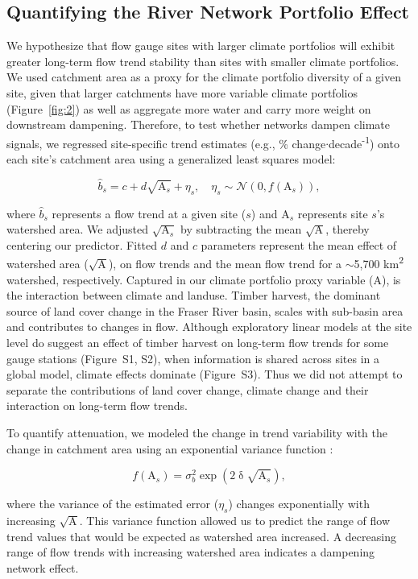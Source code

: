 \documentclass[draft,linenumbers]{AGUJournal}
\begin{document}
\subsection{Quantifying the River Network Portfolio Effect}

We hypothesize that flow gauge sites with larger climate portfolios will exhibit greater long-term flow trend stability than sites with smaller climate portfolios. We used catchment area as a proxy for the climate portfolio diversity of a given site, given that larger catchments have more variable climate portfolios (Figure~\ref{fig:2}) as well as aggregate more water and carry more weight on downstream dampening. Therefore, to test whether networks dampen climate signals, we regressed site-specific trend estimates (e.g., \% change$\cdot$decade\textsuperscript{-1}) onto each site's catchment area using a generalized least squares model:
\begin{linenomath*}
\begin{equation}
	\hat{b}_{s} = c + d\sqrt{\mathrm{A}_{s}} + \eta_{s}, \quad
  \eta_{s} \sim \mathcal{N}(0, f(\mathrm{A}_{s})) \label{eq3},
\end{equation}
\end{linenomath*}
where $\hat{b}_{s}$ represents a flow trend at a given site ($s$) and $\mathrm{A}_{s}$ represents site $s$'s watershed area. We adjusted $\sqrt{\mathrm{A}_{s}}$ by subtracting the mean $\sqrt{\mathrm{A}}$, thereby centering our predictor. Fitted $d$ and $c$ parameters represent the mean effect of watershed area ($\sqrt{\mathrm{A}}$), on flow trends and the mean flow trend for a $\sim$5,700 km\textsuperscript{2} watershed, respectively. Captured in our climate portfolio proxy variable ($\mathrm{A}$), is the interaction between climate and landuse. Timber harvest, the dominant source of land cover change in the Fraser River basin, scales with sub-basin area and contributes to changes in flow. Although exploratory linear models at the site level do suggest an effect of timber harvest on long-term flow trends for some gauge stations (Figure~S1, S2), when information is shared across sites in a global model, climate effects dominate (Figure~S3). Thus we did not attempt to separate the contributions of land cover change, climate change and their interaction on long-term flow trends.

To quantify attenuation, we modeled the change in trend variability with the change in catchment area using an exponential variance function \citep[p.~211]{Pinheiro:2000}: 
\begin{linenomath*}
\begin{equation}
	f(\mathrm{A}_{s}) = \sigma_b^2 \exp(2\updelta\sqrt{\mathrm{A}_{s}}) \label{eq4},
\end{equation}
\end{linenomath*}
where the variance of the estimated error ($\eta_{s}$) changes exponentially with increasing $\sqrt{\mathrm{A}}$. This variance function allowed us to predict the range of flow trend values that would be expected as watershed area increased. A decreasing range of flow trends with increasing watershed area indicates a dampening network effect.
\end{document}
